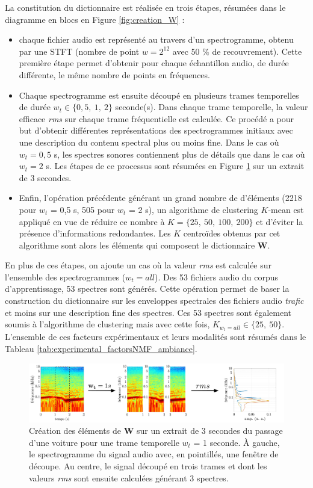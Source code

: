 La constitution du dictionnaire est réalisée en trois étapes, résumées dans le diagramme en blocs en Figure \ref{fig:creation_W} : 
\begin{itemize}
\item chaque fichier audio est représenté au travers d'un spectrogramme, obtenu par une STFT (nombre de point $w = 2^{12}$ avec 50 $\%$ de recouvrement). Cette première étape permet d'obtenir pour chaque échantillon audio, de durée différente, le même nombre de points en fréquences.
\item Chaque spectrogramme est ensuite découpé en plusieurs trames temporelles de durée $w_t \in \lbrace 0,5,~ 1,~ 2\rbrace$ seconde(s). Dans chaque trame temporelle, la valeur efficace \textit{rms} sur chaque trame fréquentielle est calculée. Ce procédé a pour but d'obtenir différentes représentations des spectrogrammes initiaux avec une description du contenu spectral plus ou moins fine. Dans le cas où $w_t = 0,5$ s, les spectres sonores contiennent plus de détails que dans le cas où $w_t = 2$ s. Les étapes de ce processus sont résumées en Figure \ref{fig:decoupe_W} sur un extrait de 3 secondes.
\item Enfin, l'opération précédente générant un grand nombre de d'éléments (2218 pour $w_t$ = 0,5 s, 505 pour $w_t$ = 2 s), un algorithme de clustering $K$-mean est appliqué en vue de réduire ce nombre à $K = \lbrace 25,~50,~100,~200 \rbrace$ et d'éviter la présence d'informations redondantes. Les $K$ centroïdes obtenus par cet algorithme sont alors les éléments qui composent le dictionnaire $\mathbf{W}$.
\end{itemize}

En plus de ces étapes, on ajoute un cas où la valeur \textit{rms} est calculée sur l'ensemble des spectrogrammes ($w_t = all$). Des 53 fichiers audio du corpus d'apprentissage, 53 spectres sont générés. Cette opération permet de baser la construction du dictionnaire sur les enveloppes spectrales des fichiers audio \textit{trafic} et moins sur une description fine des spectres. Ces 53 spectres sont également soumis à l'algorithme de clustering mais avec cette fois, $K_{w_t = all} \in \lbrace 25,~ 50 \rbrace$. 
L'ensemble de ces facteurs expérimentaux et leurs modalités sont résumés dans le Tableau \ref{tab:experimental_factorsNMF_ambiance}.

\begin{figure}[hbtp]
\centering
\includegraphics[width=\linewidth]{./figures/NMF/dictionaire_frame_FR.pdf} 
\caption{Création des éléments de $\mathbf{W}$ sur un extrait de 3 secondes du passage d'une voiture pour une trame temporelle $w_t$ = 1 seconde. À gauche, le spectrogramme du signal audio avec, en pointillés, une fenêtre de découpe. Au centre, le signal découpé en trois trames et dont les valeurs \textit{rms} sont ensuite calculées générant 3 spectres.}
\label{fig:decoupe_W}
\end{figure}

